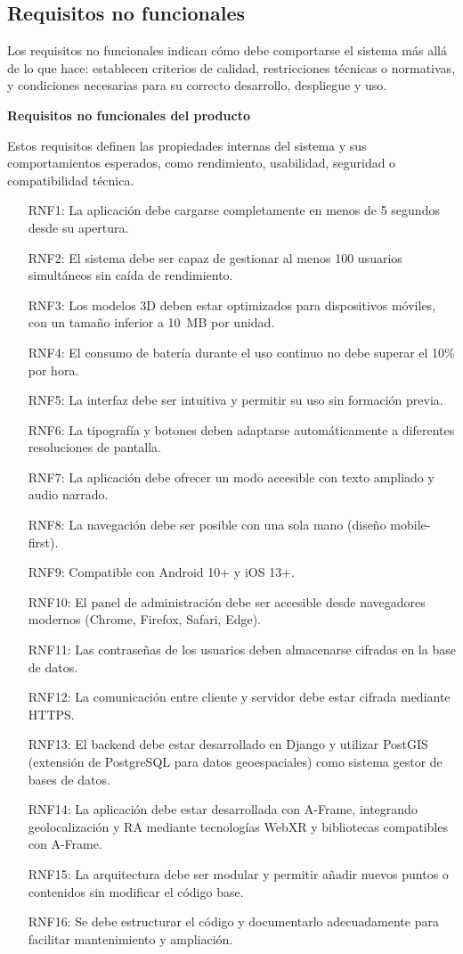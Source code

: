 \subsection{Requisitos no funcionales}
Los requisitos no funcionales indican cómo debe comportarse el sistema más allá de lo que hace: establecen criterios de calidad, restricciones técnicas o normativas, y condiciones necesarias para su correcto desarrollo, despliegue y uso.

\textbf{Requisitos no funcionales del producto}

Estos requisitos definen las propiedades internas del sistema y sus comportamientos esperados, como rendimiento, usabilidad, seguridad o compatibilidad técnica.

\begin{itemize}
    \item[RNF1:] La aplicación debe cargarse completamente en menos de 5 segundos desde su apertura.
    \item[RNF2:] El sistema debe ser capaz de gestionar al menos 100 usuarios simultáneos sin caída de rendimiento.
    \item[RNF3:] Los modelos 3D deben estar optimizados para dispositivos móviles, con un tamaño inferior a 10~MB por unidad.
    \item[RNF4:] El consumo de batería durante el uso continuo no debe superar el 10\% por hora.
    \item[RNF5:] La interfaz debe ser intuitiva y permitir su uso sin formación previa.
    \item[RNF6:] La tipografía y botones deben adaptarse automáticamente a diferentes resoluciones de pantalla.
    \item[RNF7:] La aplicación debe ofrecer un modo accesible con texto ampliado y audio narrado.
    \item[RNF8:] La navegación debe ser posible con una sola mano (diseño mobile-first).
    \item[RNF9:] Compatible con Android 10+ y iOS 13+.
    \item[RNF10:] El panel de administración debe ser accesible desde navegadores modernos (Chrome, Firefox, Safari, Edge).
    \item[RNF11:] Las contraseñas de los usuarios deben almacenarse cifradas en la base de datos.
    \item[RNF12:] La comunicación entre cliente y servidor debe estar cifrada mediante HTTPS.
    \item[RNF13:] El backend debe estar desarrollado en Django y utilizar PostGIS (extensión de PostgreSQL para datos geoespaciales) como sistema gestor de bases de datos.
    \item[RNF14:] La aplicación debe estar desarrollada con A-Frame, integrando geolocalización y RA mediante tecnologías WebXR y bibliotecas compatibles con A-Frame.
    \item[RNF15:] La arquitectura debe ser modular y permitir añadir nuevos puntos o contenidos sin modificar el código base.
    \item[RNF16:] Se debe estructurar el código y documentarlo adecuadamente para facilitar mantenimiento y ampliación.
\end{itemize}

